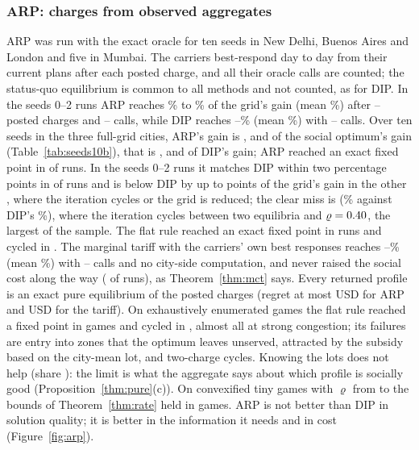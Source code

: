 \documentclass[preprint,11pt]{elsarticle}
\theoremstyle{definition}
\theoremstyle{remark}
\begin{document}
\subsubsection{ARP: charges from observed aggregates}\label{sec:res-arp}

ARP was run with the exact oracle for ten seeds in New Delhi, Buenos Aires and London and five in Mumbai. The carriers best-respond day to day from their current plans after each posted charge, and all their oracle calls are counted; the status-quo equilibrium is common to all methods and not counted, as for DIP. In the seeds 0--2 runs ARP reaches \ArpGainMin\% to \ArpGainMax\% of the grid's gain (mean \ArpGainMean\%) after \ArpRoundsMin--\ArpRoundsMax{} posted charges and \ArpCallsMin--\ArpCallsMax{} calls, while DIP reaches \ArpDipGainMin--\ArpDipGainMax\% (mean \ArpDipGainMean\%) with \ArpDipCallsMin--\ArpDipCallsMax{} calls. Over ten seeds in the three full-grid cities, ARP's gain is \TenSoArpNewDelhi, \TenSoArpBuenosAires{} and \TenSoArpLondon{} of the social optimum's gain (Table~\ref{tab:seeds10b}), that is \TenArpDipNewDelhi, \TenArpDipBuenosAires{} and \TenArpDipLondon{} of DIP's gain; ARP reached an exact fixed point in \TenArpFixedN{} of \TenArpRuns{} runs. In the seeds 0--2 runs it matches DIP within two percentage points in \ArpEqualsDipN{} of \ArpRuns{} runs and is below DIP by up to \ArpDipGapMax{} points of the grid's gain in the other \ArpDipGapN, where the iteration cycles or the grid is reduced; the clear miss is \ArpMissCase{} (\ArpMissGain\% against DIP's \ArpMissDip\%), where the iteration cycles between two equilibria and $\varrho=0.40$, the largest of the sample. The flat rule reached an exact fixed point in \ArpFixedN{} runs and cycled in \ArpCycleN. The marginal tariff with the carriers' own best responses reaches \MctGainMin--\MctGainMax\% (mean \MctGainMean\%) with \MctCallsMin--\MctCallsMax{} calls and no city-side computation, and never raised the social cost along the way (\MctMonotoneN{} of \ArpRuns{} runs), as Theorem~\ref{thm:mct} says. Every returned profile is an exact pure equilibrium of the posted charges (regret at most \ArpRegretMax{} USD for ARP and \MctRegretMax{} USD for the tariff). On \ArpTinyN{} exhaustively enumerated games the flat rule reached a fixed point in \ArpTinyFixedN{} games and cycled in \ArpTinyCycleN, almost all at strong congestion; its failures are entry into zones that the optimum leaves unserved, attracted by the subsidy based on the city-mean lot, and two-charge cycles. Knowing the lots does not help (share \ArpKnownTinyShare): the limit is what the aggregate says about which profile is socially good (Proposition~\ref{thm:pure}(c)). On \ArpRatesN{} convexified tiny games with $\varrho$ from \ArpRatesRhoMin{} to \ArpRatesRhoMax{} the bounds of Theorem~\ref{thm:rate} held in \ArpRatesAllOK{} games. ARP is not better than DIP in solution quality; it is better in the information it needs and in cost (Figure~\ref{fig:arp}).
\end{document}
